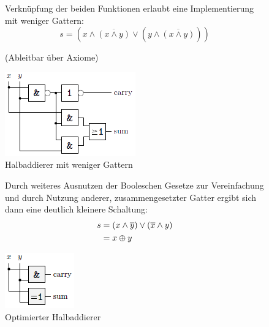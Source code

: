 \documentclass[12pt]{report}
\begin{document}
\begin{figure}[H]
  \begin{minipage}[t]{.45\textwidth}
    Verknüpfung der beiden Funktionen erlaubt eine Implementierung mit weniger Gattern:
    $$s = (x \wedge \overline{(x \wedge y)} \vee (y \wedge \overline{(x \wedge y)}))$$
    \begin{center}
      \small (Ableitbar über Axiome)
    \end{center}
  \end{minipage}
  \hfill
  \begin{minipage}[t]{.45\textwidth}
    \caption{Halbaddierer mit weniger Gattern}
    \centering
    \includegraphics{halbaddierer_02}
  \end{minipage}
\end{figure}

\begin{figure}[H]
  \begin{minipage}[t]{.45\textwidth}
    Durch weiteres Ausnutzen der Booleschen Gesetze zur Vereinfachung und
    durch Nutzung anderer, zusammengesetzter Gatter ergibt sich dann eine deutlich kleinere Schaltung:
    \begin{align*}
      \centering
      s 
       & = (x \wedge \overline{y}) \vee (\overline{x} \wedge y) \\
       & = x \oplus y                                           \\
    \end{align*}
  \end{minipage}
  \hfill
  \begin{minipage}[t]{.45\textwidth}
    \caption{Optimierter Halbaddierer}
    \centering
    \includegraphics[scale=1.3]{halbaddierer_optimiert}
  \end{minipage}
\end{figure}
\end{document}
